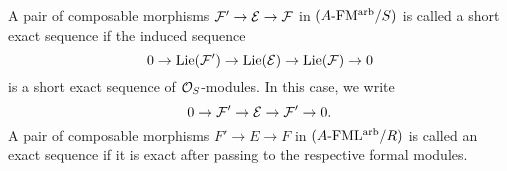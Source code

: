 \documentclass[../main.tex]{subfiles}
\begin{document}
\begin{defi}\label{def:SESofFormalModules}
  A pair of composable morphisms $\mathcal{F}' \to \mathcal{E} \to \mathcal{F}$ in 
  ${({A}\text-\allowbreak\mathrm{FM^{arb}}/{S})}$ is called 
  a short exact sequence if the induced sequence 
  \begin{equation*}
    0 \to \operatorname{Lie}(\mathcal{F}') \to \operatorname{Lie}(\mathcal{E}) \to \operatorname{Lie}(\mathcal{F}) \to 0
  \end{equation*}
  is a short exact sequence of $\mathcal{O}_S$-modules. In this case, we write
  \begin{equation*}
    0 \to \mathcal{F}' \to \mathcal{E} \to \mathcal{F}' \to 0.
  \end{equation*}
  A pair of composable morphisms $F' \to E \to F$ in ${({A}\text-\allowbreak\mathrm{FML^{arb}}/{R})}$
  is called an exact sequence if it is exact after passing to 
  the respective formal modules. 
\end{defi}
\end{document}

